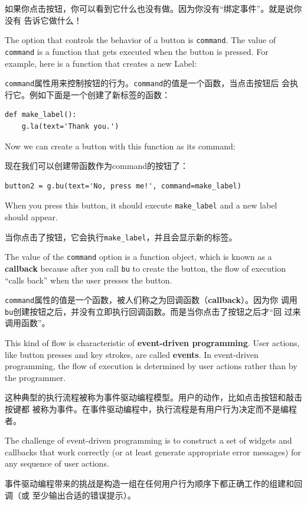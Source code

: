 \documentclass[10pt]{book}
\begin{document}
\begin{CJK}{UTF8}{gbsn}
如果你点击按钮，你可以看到它什么也没有做。因为你没有``绑定事件''。就是说你没有
告诉它做什么！

The option that controls the behavior of a button is {\tt command}.
The value of {\tt command} is a function that gets executed when
the button is pressed.  For example, here is a function that creates
a new Label:

{\tt command}属性用来控制按钮的行为。{\tt command}的值是一个函数，当点击按钮后
会执行它。例如下面是一个创建了新标签的函数：

\begin{verbatim}
def make_label():
    g.la(text='Thank you.')
\end{verbatim}
%
Now we can create a button with this function as its command:

现在我们可以创建带函数作为command的按钮了：

\begin{verbatim}
button2 = g.bu(text='No, press me!', command=make_label)
\end{verbatim}
%
When you press this button, it should execute \verb"make_label"
and a new label should appear.

当你点击了按钮，它会执行\verb"make_label"，并且会显示新的标签。

The value of the {\tt command} option
is a function object, which is known as a {\bf callback} because
after you call {\tt bu} to create the button, the flow of execution
``calls back'' when the user presses the button.

{\tt command}属性的值是一个函数，被人们称之为回调函数（{\bf callback}）。因为你
调用{\tt bu}创建按钮之后，并没有立即执行回调函数。而是当你点击了按钮之后才``回
过来调用函数''。

This kind of flow is characteristic of {\bf event-driven programming}.
User actions, like button presses and key strokes, are called {\bf
events}.  In event-driven programming, the flow of execution is
determined by user actions rather than by the programmer.  

这种典型的执行流程被称为事件驱动编程模型。用户的动作，比如点击按钮和敲击按键都
被称为事件。在事件驱动编程中，执行流程是有用户行为决定而不是编程者。

The challenge of event-driven programming is to construct a set of
widgets and callbacks that work correctly (or at least generate
appropriate error messages) for any sequence of user actions.

事件驱动编程带来的挑战是构造一组在任何用户行为顺序下都正确工作的组建和回调（或
至少输出合适的错误提示）。


\end{CJK}
\end{document}
